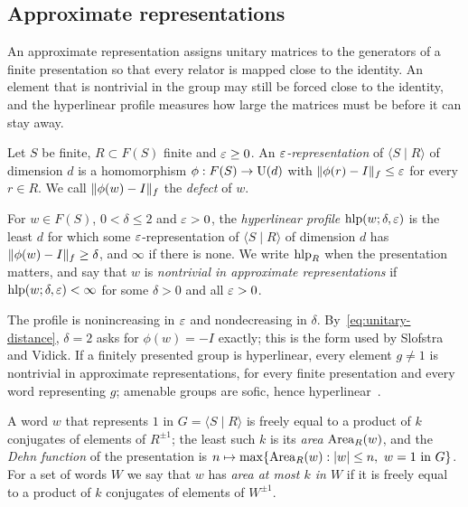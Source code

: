 \subsection{Approximate representations}

An approximate representation assigns unitary matrices to the generators of a finite presentation so that every relator is mapped close
to the identity. An element that is nontrivial in the group may still be forced close to the identity, and the hyperlinear profile
measures how large the matrices must be before it can stay away.

\begin{definition}\label{def:approx-rep}
Let $S$ be finite, $R\subset F(S)$ finite and $\varepsilon\ge0$. An \emph{$\varepsilon$-representation} of $\langle S\mid R\rangle$ of dimension $d$ is a
homomorphism $\phi:F(S)\to\mathrm U(d)$ with $\lVert \phi(r)-I\rVert_f\le\varepsilon$ for every $r\in R$. We call $\lVert \phi(w)-I\rVert_f$ the \emph{defect} of $w$.
\end{definition}

\begin{definition}\label{def:hlp}
For $w\in F(S)$, $0<\delta\le2$ and $\varepsilon>0$, the \emph{hyperlinear profile} $\operatorname{hlp}(w;\delta,\varepsilon)$ is the least $d$ for which some
$\varepsilon$-representation of $\langle S\mid R\rangle$ of dimension $d$ has $\lVert \phi(w)-I\rVert_f\ge\delta$, and $\infty$ if there is none. We write
$\operatorname{hlp}_R$ when the presentation matters, and say that $w$ is \emph{nontrivial in approximate representations} if
$\operatorname{hlp}(w;\delta,\varepsilon)<\infty$ for some $\delta>0$ and all $\varepsilon>0$.
\end{definition}

The profile is nonincreasing in $\varepsilon$ and nondecreasing in $\delta$. By~\eqref{eq:unitary-distance}, $\delta=2$ asks for $\phi(w)=-I$
exactly; this is the form used by Slofstra and Vidick. If a finitely presented group is hyperlinear, every element $g\ne1$ is nontrivial
in approximate representations, for every finite presentation and every word representing $g$; amenable groups are sofic, hence
hyperlinear~\cite{Gro99,Wei00,ES05,Pes08}.

A word $w$ that represents $1$ in $G=\langle S\mid R\rangle$ is freely equal to a product of $k$ conjugates of elements of $R^{\pm1}$; the
least such $k$ is its \emph{area} $\operatorname{Area}_R(w)$, and the \emph{Dehn function} of the presentation is
$n\mapsto\max\{\operatorname{Area}_R(w):\lvert w\rvert\le n,\ w=1\text{ in }G\}$. For a set of words $W$ we say that $w$ has \emph{area at most $k$ in $W$}
if it is freely equal to a product of $k$ conjugates of elements of $W^{\pm1}$.

